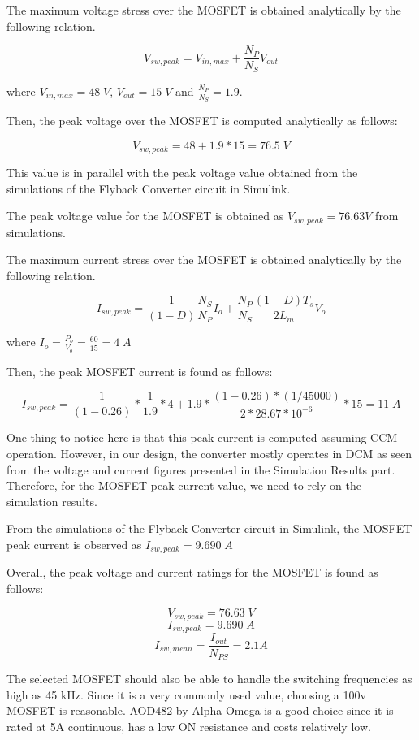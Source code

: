 The maximum voltage stress over the MOSFET is obtained analytically by the following relation.

$$ V_{sw,peak} = V_{in,max} + \frac{N_P}{N_S}V_{out} $$

where $ V_{in,max} = 48\;V $, $ V_{out} = 15\;V $ and $ \frac{N_P}{N_S} = 1.9 $.

Then, the peak voltage over the MOSFET is computed analytically as follows:

$$ V_{sw,peak} = 48 + 1.9*15 = 76.5\;V $$

This value is in parallel with the peak voltage value obtained from the simulations of the Flyback Converter circuit in Simulink.

The peak voltage value for the MOSFET is obtained as $ V_{sw,peak} = 76.63 V $ from simulations.

The maximum current stress over the MOSFET is obtained analytically by the following relation.

$$ I_{sw,peak} = \frac{1}{(1-D)}\frac{N_S}{N_P}I_o + \frac{N_P}{N_S}\frac{(1-D)T_s}{2L_m}V_o $$

where $ I_o = \frac{P_o}{V_o} = \frac{60}{15} = 4\;A $

Then, the peak MOSFET current is found as follows:

$$ I_{sw,peak} = \frac{1}{(1-0.26)}*\frac{1}{1.9}*4 + 1.9*\frac{(1-0.26)*(1/45000)}{2*28.67*10^{-6}}*15 = 11\;A$$

One thing to notice here is that this peak current is computed assuming CCM operation. However, in our design, the converter mostly operates in DCM as seen from the voltage and current figures presented in the Simulation Results part. Therefore, for the MOSFET peak current value, we need to rely on the simulation results.

From the simulations of the Flyback Converter circuit in Simulink, the MOSFET peak current is observed as $ I_{sw,peak} = 9.690\;A $

Overall, the peak voltage and current ratings for the MOSFET is found as follows:

$$ V_{sw,peak} = 76.63\;V $$
$$ I_{sw,peak} = 9.690\;A $$
$$ I_{sw,mean} = \frac{I_{out}}{N_{PS}} = 2.1A $$

The selected MOSFET should also be able to handle the switching frequencies as high as 45 kHz. 
Since it is a very commonly used value, choosing a 100v MOSFET is reasonable. AOD482 by Alpha-Omega is a good choice since it is rated at 5A continuous, has a low ON resistance and costs relatively low.

